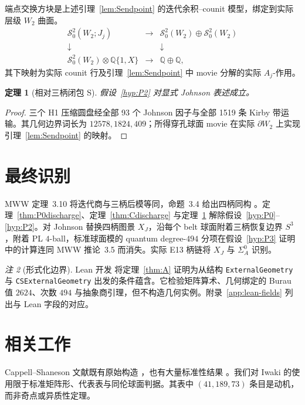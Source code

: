 \documentclass[11pt]{amsart}
\newtheorem{theorem}{定理}[section]
\theoremstyle{definition}
\theoremstyle{remark}
\newtheorem{remark}[theorem]{注}
\newcommand{\Q}{\mathbb{Q}}
\begin{document}
端点交换方块是上述引理~\ref{lem:Sendpoint} 的迭代余积--counit 模型，绑定到实际层级 $W_2$ 曲面。
\[
\begin{array}{ccc}
\mathcal S^2_0(W_2;J_j)&\longrightarrow&
\mathcal S^2_0(W_2)\oplus\mathcal S^2_0(W_2)\\
\downarrow&&\downarrow\\
\mathcal S^2_0(W_2)\otimes\Q\{1,X\}&\longrightarrow&\Q\oplus\Q,
\end{array}
\]
其下映射为实际 counit 行及引理~\ref{lem:Sendpoint} 中 movie 分解的实际 \(A_j\)-作用。

\begin{theorem}[相对三柄闭包 S]\label{thm:Sdischarge}
假设~\ref{hyp:P2} 对显式 Johnson 表述成立。
\end{theorem}

\begin{proof}
三个 H1 压缩圆盘经全部 93 个 Johnson 因子与全部 1519 条 Kirby 带运输。其几何边界词长为
$12578,1824,409$；所得穿孔球面 movie 在实际 $\partial W_2$ 上实现引理~\ref{lem:Sendpoint} 的映射。
\end{proof}
\section{最终识别}\label{sec:final-identifications}

MWW 定理~3.10 将迭代商与三柄后模等同，命题~3.4 给出四柄同构 \cite{ManolescuWalkerWedrich2023}。定理~\ref{thm:P0discharge}、定理~\ref{thm:Cdischarge} 与定理~\ref{thm:Sdischarge} 解除假设~\ref{hyp:P0}--\ref{hyp:P2}。对 Johnson 替换四柄图景 $X_J$，沿每个 belt 球面附着三柄恢复边界 $S^3$，附着 PL $4$-ball，标准球面模的 quantum degree-$494$ 分项在假设~\ref{hyp:P3} 证明中的计算连同 MWW 推论~3.5 而消失。实际 E13 柄链将 $X_J$ 与 $\Sigma_A^0$ 识别。

\begin{remark}[形式化边界]\label{rem:lean-boundary}
Lean 开发 \cite{Lean4} 将定理~\ref{thm:A} 证明为从结构 \texttt{ExternalGeometry} 与 \texttt{CSExternalGeometry} 出发的条件蕴含。它检验矩阵算术、几何绑定的 Burau 值 $2624$、次数 $494$ 与抽象商引理，但不构造几何实例。附录~\ref{app:lean-fields} 列出与 Lean 字段的对应。
\end{remark}

\section{相关工作}

Cappell--Shaneson 文献既有原始构造 \cite{CappellShaneson1976,AitchisonRubinstein1984}，也有大量标准性结果 \cite{Akbulut2010,Gompf2010,KimYamada2017,Iwaki2024}。我们对 Iwaki 的使用限于标准矩阵形、代表表与同伦球面判据。其表中 $(41,189,73)$ 条目是动机，而非奇点或异质性定理。
\end{document}
